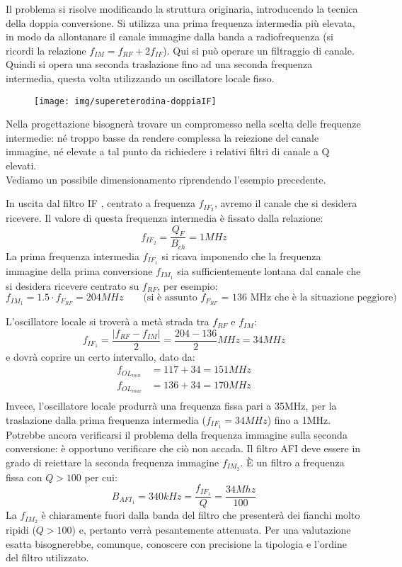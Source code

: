 Il problema si risolve modificando la struttura originaria, introducendo la tecnica della doppia conversione. Si utilizza una prima frequenza intermedia più elevata, in modo da allontanare il canale immagine dalla banda a radiofrequenza (si ricordi la relazione $f_{IM} = f_{RF} + 2 f_{IF}$). Qui si può operare un filtraggio di canale.\\
Quindi si opera una seconda traslazione fino ad una seconda frequenza intermedia, questa volta utilizzando un oscillatore locale fisso.

\begin{figure}[hbt]
	\centering
	\texttt{[image: img/supereterodina-doppiaIF]}
	\caption{}
	\label{fig:supereterodina-doppiaif}
\end{figure}


Nella progettazione bisognerà trovare un compromesso nella scelta delle frequenze intermedie: né troppo basse da rendere complessa la reiezione del canale immagine, né elevate a tal punto da richiedere i relativi filtri di canale a Q elevati.
\\
Vediamo un possibile dimensionamento riprendendo l'esempio precedente.

In uscita dal filtro IF , centrato a frequenza $f_{IF_2}$, avremo il canale che si desidera ricevere. Il valore di questa frequenza intermedia è fissato dalla relazione:
\[f_{IF_2} = \frac{Q_F}{B_{ch}} = 1 MHz\]
La prima frequenza intermedia $f_{IF_1}$ si ricava imponendo che la frequenza immagine della prima conversione $f_{IM_1}$ sia sufficientemente lontana dal canale che si desidera ricevere centrato su $f_{RF}$, per esempio:
\[f_{IM_1} = 1.5 \cdot f_{F_{RF}} = 204 MHz
\qquad \mbox{(si è assunto $f_{F_{RF}}$ = 136 MHz che è la situazione peggiore)}\]

L'oscillatore locale si troverà a metà strada tra $f_{RF}$ e $f_{IM}$:
\[
f_{IF_1} = \frac{|f_{RF}-f_{IM}|}{2}=
\frac{204-136}{2} MHz = 34MHz
\]
e dovrà coprire un certo intervallo, dato da:
\begin{align*}
f_{OL_{min}} &= 117+34 = 151MHz\\
f_{OL_{max}} &= 136+34 = 170MHz\\
\end{align*}
Invece, l'oscillatore locale  produrrà una frequenza fissa pari a 35MHz, per la traslazione dalla prima frequenza intermedia ($f_{IF_1}= 34MHz$) fino a 1MHz.
Potrebbe ancora verificarsi il problema della frequenza immagine sulla seconda conversione: è opportuno verificare che ciò non accada. Il filtro AFI  deve essere in grado di reiettare la seconda frequenza immagine $f_{IM_2}$. È un filtro a frequenza fissa con $Q>100$ per cui:
\[ B_{AFI_1} = 340 kHz = \frac{f_{IF_1}}{Q} = \frac{34Mhz}{100}
\]
La $f_{IM_2}$ è chiaramente fuori dalla banda del filtro che presenterà dei fianchi molto ripidi ($Q>100$) e, pertanto verrà pesantemente attenuata. Per una valutazione esatta bisognerebbe, comunque, conoscere con precisione la tipologia e l'ordine del filtro utilizzato.

